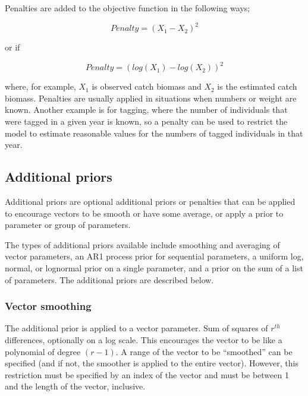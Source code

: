 Penalties are added to the objective function in the following ways;

\begin{equation}
	Penalty = (X_1 - X_2)^2
\end{equation}

or if 

\begin{equation}
Penalty = (log(X_1) - log(X_2))^2
\end{equation}

where, for example, $X_1$ is observed catch biomass and $X_2$ is the estimated catch biomass. Penalties are usually applied in situations when numbers or weight are known. Another example is for tagging, where the number of individuals that were tagged in a given year is known, so a penalty can be used to restrict the model to estimate reasonable values for the numbers of tagged individuals in that year.

\subsection{Additional priors\label{sec:AdditionalPriors}}

Additional priors are optional additional priors or penalties that can be applied to encourage vectors to be smooth or have some average, or apply a prior to parameter or group of parameters.

The types of additional priors available include smoothing and averaging of vector parameters, an AR1 process prior for sequential parameters, a uniform log, normal, or lognormal prior on a single parameter, and a prior on the sum of a list of parameters. The additional priors are described below.

\subsubsection{Vector smoothing}\label{sec:AdditionalPrior-VectorSmoothing}

The  additional prior is applied to a vector parameter. Sum of squares of $r^{th}$ differences, optionally on a log scale. This encourages the vector to be like a polynomial of degree $(r-1)$. A range of the vector to be ``smoothed'' can be specified (and if not, the smoother is applied to the entire vector). However, this restriction must be specified by an index of the vector and must be between 1 and the length of the vector, inclusive.

